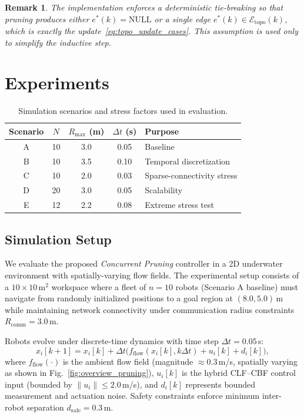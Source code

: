 \documentclass[conference]{IEEEconf}
\theoremstyle{plain}
\newtheorem{remark}{Remark}
\begin{document}
\begin{remark}
The implementation enforces a deterministic tie-breaking so that pruning produces either
$e^*(k)=\mathrm{NULL}$ or a single edge $e^*(k)\in\mathcal{E}_{\mathrm{topo}}(k)$, which is exactly the update~\eqref{eq:topo_update_cases}.
This assumption is used only to simplify the inductive step.
\end{remark}

\section{Experiments}
\label{sec:experiments}

\begin{table}[t]
\centering
\caption{Simulation scenarios and stress factors used in evaluation.}
\label{tab:scenarios}
\setlength{\tabcolsep}{5pt}
\footnotesize
\begin{tabular}{ccccp{}}
\toprule
\textbf{Scenario} & \textbf{$N$} & \textbf{$R_{\max}$ (m)} & \textbf{$\Delta t$ (s)} & \textbf{Purpose} \\
\midrule
A & 10 & 3.0 & 0.05 & Baseline \\
B & 10 & 3.5 & 0.10 & Temporal discretization \\
C & 10 & 2.0 & 0.03 & Sparse-connectivity stress\\
D & 20 & 3.0 & 0.05 & Scalability \\
E & 12 & 2.2 & 0.08 & Extreme stress test\\
\bottomrule
\end{tabular}
\end{table}
\FloatBarrier

\subsection{Simulation Setup}
\label{subsec:sim_setup}
We evaluate the proposed \emph{Concurrent Pruning} controller in a 2D underwater environment with spatially-varying flow fields.
The experimental setup consists of a $10 \times 10$\,m$^2$ workspace where a fleet of $n{=}10$ robots (Scenario A baseline) 
must navigate from randomly initialized positions to a goal region at $(8.0, 5.0)$\,m while maintaining network connectivity 
under communication radius constraints $R_{\mathrm{comm}}{=}3.0$\,m.

Robots evolve under discrete-time dynamics with time step $\Delta t{=}0.05$\,s:
\begin{equation}
x_i[k{+}1]
=
x_i[k]
+
\Delta t\Big(f_{\mathrm{flow}}(x_i[k],k\Delta t) + u_i[k] + d_i[k]\Big),
\label{eq:sim_euler}
\end{equation}
where $f_{\mathrm{flow}}(\cdot)$ is the ambient flow field (magnitude $\approx 0.3$\,m/s, spatially varying as shown in Fig.~\ref{fig:overview_pruning}),
$u_i[k]$ is the hybrid CLF--CBF control input (bounded by $\|u_i\|{\leq}2.0$\,m/s), and $d_i[k]$ represents bounded measurement 
and actuation noise. Safety constraints enforce minimum inter-robot separation $d_{\mathrm{safe}}{=}0.3$\,m.
\end{document}
